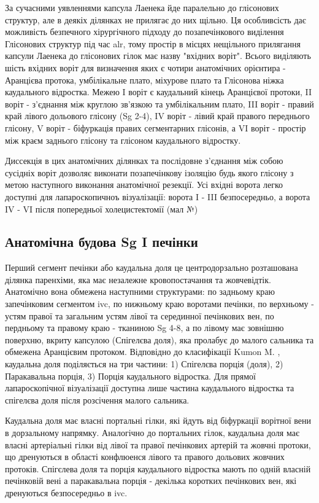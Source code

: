 \begin{refsection}
За сучасними уявленнями капсула Лаенека йде паралельно до глісонових структур, але в деякіх ділянках не прилягає до них щільно. Ця особливсість дає можливість безпечного хірургічного підходу до позапечінкового виділення Глісонових структур під час \acrshort{alr}, тому простір в місцях нещільного прилягання капсули Лаенека до глісонових гілок має назву "вхідних воріт". Всього виділяють шість вхідних воріт для визначення яких є чотири анатомічних орієнтира - Аранцієва протока, умбілікальне плато, міхурове плато та Глісонова ніжка каудального відростка. Межею I воріт є каудальний кінець Аранцієвої протоки, II воріт - з'єднання між круглою зв'язкою та умбілікальним плато, III воріт - правий край лівого дольового глісону (Sg 2-4), IV воріт - лівий край правого переднього глісону, V воріт - біфуркація правих сегментарних глісонів, а VI воріт - простір між краєм заднього глісону та глісоном каудального відростку. 

Диссекція в цих анатомічних ділянках та послідовне з'єднання між собою сусідніх воріт дозволяє виконати позапечінкову ізоляцію будь якого глісону з метою наступного виконання анатомічної резекції. Усі вхідні ворота легко доступні для лапароскопичноъ візуалізації: ворота I - III безпосередньо, а ворота IV - VI після попередньої холецистектомії (мал №)

\subsection{Анатомічна будова Sg I печінки}

Перший сегмент печінки або каудальна доля це центродорзально розташована ділянка паренхіми, яка має незалежне кровопостачання та жовчевідтік. Анатомічно вона обмежена наступними структурами: по задньому краю запечінковим сегментом \acrshort{ivc}, по нижньому краю воротами печінки, по верхньому - устям правої та загальним устям лівої та серединної печінкових вен, по пердньому та правому краю - тканиною Sg 4-8, а по лівому має зовнішню поверхню, вкриту капсулою (Спігелєва доля), яка пролабує до малого сальника та обмежена Аранцієвим протоком. Відповідно до класифікації Kumon M. \cite{Kumon2017}, каудальна доля поділяється на три частини: 1) Спігелєва порція (доля),  2) Паракавальна порція, 3) Порція каудального відростка. Для прямої лапароскопічної візуалізації  доступна лише частина каудального відростка та спігелєва доля після розсічення малого сальника.

Каудальна доля має власні портальні гілки, які йдуть від біфуркації ворітної вени в дорзальному напрямку. Аналогічно до портальних гілок, каудальна доля має власні артеріальні гілки від лівої та правої печінкових артерій та жовчні протоки, що дренуються в області конфлюенся лівого та правого дольових жовчних протоків. Спігєлева доля та порція каудального відростка мають по одній власній печінковій вені а паракавальна порція - декілька коротких печінкових вен, які дренуються безпосередньо в \acrshort{ivc}. 



\end{refsection}
